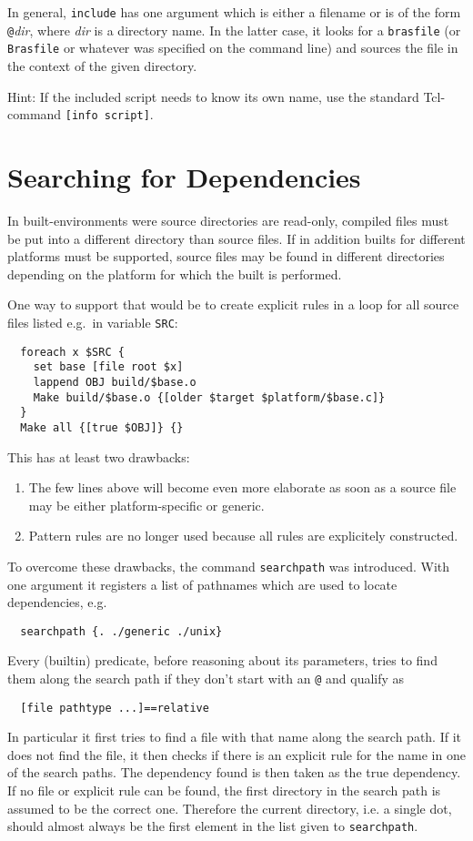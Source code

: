 \documentclass[11pt,bibtotoc,idxtotoc]{scrreprt}
\makeatletter
\newcommand{\brasfile}{\texttt{brasfile}}
\newcommand{\Brasfile}{\texttt{Brasfile}}
\newcommand{\Indextt}[1]{\texttt{#1}\index{#1@\texttt{#1}}}
\makeatother
\begin{document}
In general, \texttt{include} has one argument which is either a
filename or is of the form \texttt{@}\textit{dir}, where \textit{dir}
is a directory name. In the latter case, it looks for a \brasfile{} (or
\Brasfile{} or whatever was specified on the command line) and sources
the file in the context of the given directory.

Hint: If the included script needs to know its own name, use the
standard Tcl-command \texttt{[info script]}.
\section{Searching for Dependencies}
\label{sec:searchpath}

In built-environments were source directories are read-only, compiled
files must be put into a different directory than source files. If in
addition builts for different platforms must
be supported, source files may be found in different directories
depending on the platform for which the built is performed.

One way to support that would be to create explicit rules in a loop
for all source files listed e.g.\ in variable \texttt{SRC}:
\begin{verbatim}
  foreach x $SRC {
    set base [file root $x]
    lappend OBJ build/$base.o
    Make build/$base.o {[older $target $platform/$base.c]}
  }
  Make all {[true $OBJ]} {}
\end{verbatim}

This has at least two drawbacks:
\begin{enumerate}
\item The few lines above will become even more elaborate as soon as a
  source file may be either platform-specific or generic.
\item Pattern rules are no longer used because all rules are
  explicitely constructed.
\end{enumerate}

To overcome these drawbacks, the command \Indextt{searchpath} was
introduced. With one argument it registers a list of pathnames which are
used to locate dependencies, e.g.
\begin{verbatim}
  searchpath {. ./generic ./unix}
\end{verbatim}
Every (builtin) predicate, before reasoning about its parameters,
tries to find them along the search path if they don't start with an
\texttt{@} and qualify as
\begin{verbatim}
  [file pathtype ...]==relative
\end{verbatim}
In particular it first tries to find a file with that name along the
search path. If it does not find the file, it then checks if there is
an explicit rule for the name in one of the search paths. The
dependency found is then taken as the true dependency. If no file or
explicit rule can be found, the first directory in the search path is
assumed to be the correct one. Therefore the current directory, i.e. a
single dot, should almost always be the first element in the list
given to \texttt{searchpath}.
\end{document}
